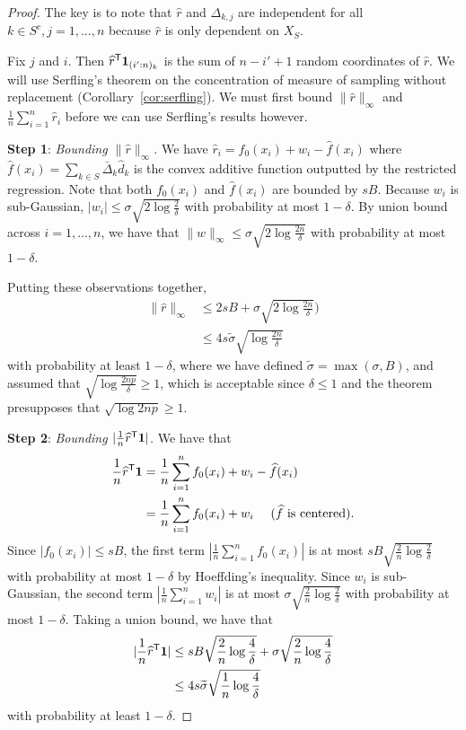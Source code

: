 \begin{proof}
The key is to note that $\hat{r}$ and $\Delta_{k,j}$ are independent for all $k \in S^c,j=1,...,n$ because $\hat{r}$ is only dependent on $X_{S}$.

Fix $j$ and $i$. Then $\widehat{r}^{\mathsf{T}} \mbox{\boldmath $1$}_{(i':n)_k}$ is the sum
of $n-i'+1$ random coordinates of $\hat{r}$. We will use
Serfling's theorem on the concentration of measure of sampling without
replacement (Corollary~\ref{cor:serfling}). We must first bound $\|
\hat{r} \|_\infty$ and $\frac{1}{n} \sum_{i=1}^n \hat{r}_i$ before we
can use Serfling's results however.

\vskip5pt
\textbf{Step 1}: {\it Bounding $\| \hat{r} \|_\infty$.} We have $\hat{r}_i = f_0(x_i) + w_i - \hat{f}(x_i)$ where
$\hat{f}(x_i) = \sum_{k \in S} \bar{\Delta}_k \hat{d}_k$ is the convex
additive function outputted by the restricted regression. Note that
both $f_0(x_i)$ and $\hat{f}(x_i)$ are bounded by $sB$. 
Because $w_i$ is sub-Gaussian, $|w_i| \leq  \sigma \sqrt{2\log \frac{2}{\delta}}$ with probability at most $1-\delta$. By union bound across $i=1,...,n$, we have that $\| w\|_\infty \leq \sigma \sqrt{ 2 \log \frac{2n}{\delta}}$ with probability at most $1 - \delta$.

Putting these observations together,
\begin{align}
\| \hat{r} \|_\infty &\leq 2sB + \sigma \sqrt{ 2\log \frac{2n}{\delta}}) \nonumber \\
      &\leq 4 s \tilde{\sigma} \sqrt{\log \frac{2n}{\delta}} \label{eqn:stepone_rhat}
\end{align}
with probability at least $1 - \delta$, where we have defined
$\tilde{\sigma} = \max(\sigma, B)$,
and assumed that $\sqrt{\log \frac{2np}{\delta}} \geq 1$, which is acceptable since $\delta \leq 1$ and the theorem presupposes that $\sqrt{ \log 2np } \geq 1$.

\vskip5pt
\textbf{Step 2}: {\it Bounding $| \frac{1}{n} \widehat{r}^{\mathsf{T}} \mbox{\boldmath $1$}
  |$.}  We have that 
\begin{align*}
\frac{1}{n} \widehat{r}^{\mathsf{T}} \mbox{\boldmath $1$} &= 
    \frac{1}{n} \sum_{i=1}^n f_0(x_i) + w_i - \widehat{f}(x_i) \\
  &= \frac{1}{n} \sum_{i=1}^n f_0(x_i) + w_i \quad \textrm{ ($\widehat{f}$ is centered)}.
\end{align*}
Since $|f_0(x_i)| \leq sB$, the first term $| \frac{1}{n} \sum_{i=1}^n
f_0(x_i)|$ is at most $sB \sqrt{\frac{2}{n} \log \frac{2}{\delta}}$
with probability at most $1-\delta$ by Hoeffding's inequality. Since
$w_i$ is sub-Gaussian, the second term $|\frac{1}{n} \sum_{i=1}^n
w_i|$ is at most $\sigma \sqrt{ \frac{2}{n} \log \frac{2}{\delta}}$
with probability at most $1-\delta$.  
Taking a union bound, we have that 
\begin{align}
| \frac{1}{n} \widehat{r}^{\mathsf{T}} \mbox{\boldmath $1$}| &\leq sB \sqrt{\frac{2}{n} \log \frac{4}{\delta}} +  \sigma \sqrt{\frac{2}{n} \log \frac{4}{\delta}} \nonumber \\
  &\leq 4 s \widetilde{\sigma} \sqrt{\frac{1}{n} \log \frac{4}{\delta}} \label{eqn:steptwo_rhat}
\end{align}
with probability at least $1-\delta$.


\end{proof}
